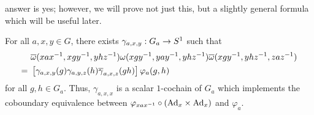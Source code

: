 answer is yes; however, we will prove not just this, but a slightly general formula which will be useful later.
\begin{prop}\label{go}
	For all $a,x,y\in G$, there exists ${\gamma}_{a,x,y}: G_a \rightarrow S^1$ such that
	 \begin{align*}
	 & \overline{\omega}(xax^{-1}, xgy^{-1}, yhz^{-1}) \omega(xgy^{-1}, yay^{-1}, yhz^{-1}) \overline{\omega}(xgy^{-1}, yhz^{-1}, zaz^{-1})\\
	  =~ & \left[\gamma_{a,x,y}(g) \gamma_{a,y,z}(h) \overline{\gamma}_{a,x,z}(gh)\right] \varphi_a(g,h)
	 \end{align*}
for all $g,h \in G_a$.
Thus, $\gamma_{a,x,x}$ is a scalar $1$-cochain of $G_a$ which implements the coboundary equivalence between $\varphi_{xax^{-1}}\circ (\text{Ad}_x \times \text{Ad}_x)$ and $\varphi_a$.
\end{prop}

